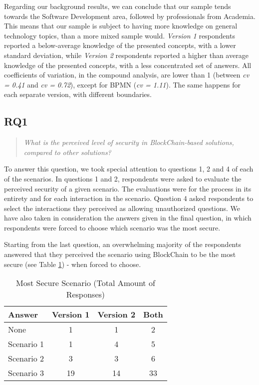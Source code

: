Regarding our background results, we can conclude that our sample tends towards the Software Development area, followed by professionals from Academia. This means that our sample is subject to having more knowledge on general technology topics, than a more mixed sample would. \textit{Version 1} respondents reported a below-average knowledge of the presented concepts, with a lower standard deviation, while \textit{Version 2} respondents reported a higher than average knowledge of the presented concepts, with a less concentrated set of answers. All coefficients of variation, in the compound analysis, are lower than 1 (between \textit{cv = 0.41} and \textit{cv = 0.72}), except for BPMN (\textit{cv = 1.11}). The same happens for each separate version, with different boundaries.

\subsection{RQ1}

\begin{quote}
\textit{What is the perceived level of security in BlockChain-based solutions, compared to other solutions?}
\end{quote}

To answer this question, we took special attention to questions 1, 2 and 4 of each of the scenarios. In questions 1 and 2, respondents were asked to evaluate the perceived security of a given scenario. The evaluations were for the process in its entirety and for each interaction in the scenario. Question 4 asked respondents to select the interactions they perceived as allowing unauthorized questions. We have also taken in consideration the answers given in the final question, in which respondents were forced to choose which scenario was the most secure.

Starting from the last question, an overwhelming majority of the respondents answered that they perceived the scenario using BlockChain to be the most secure (see Table \ref{tab: mostSecure}) - when forced to choose.

\begin{table}[htb]
    \centering
    \caption{Most Secure Scenario (Total Amount of Responses)}
    \label{tab: mostSecure}
    \begin{tabular}{l|ccc}
    \hline \bf Answer & \bf Version 1 & \bf Version 2  & \bf Both \\ \hline
    None       & 1  & 1  & 2  \\
    Scenario 1 & 1  & 4  & 5  \\
    Scenario 2 & 3  & 3  & 6 \\
    Scenario 3 & 19 & 14 & 33  \\
    \hline
    \end{tabular}
\end{table}

